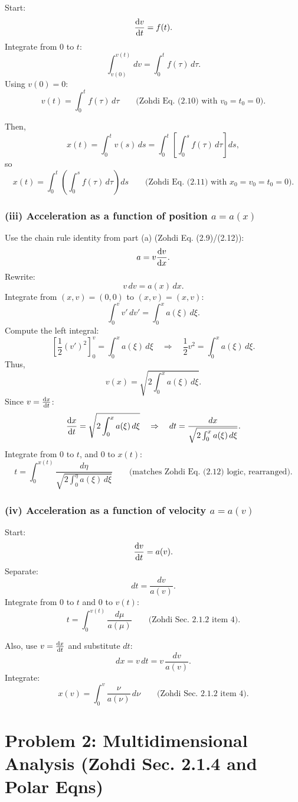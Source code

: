 \documentclass[12pt]{article}
\begin{document}
Start:
\[
\dv{v}{t} = f(t).
\]
Integrate from $0$ to $t$:
\[
\int_{v(0)}^{v(t)} dv = \int_0^{t} f(\tau)\,d\tau.
\]
Using $v(0)=0$:
\[
\boxed{v(t) = \int_0^{t} f(\tau)\,d\tau}
\qquad \text{(Zohdi Eq. (2.10) with $v_0=t_0=0$).}
\]

Then,
\[
x(t)=\int_0^{t} v(s)\,ds
     =\int_0^{t}\left[\int_0^{s} f(\tau)\,d\tau\right]ds,
\]
so
\[
\boxed{x(t)=\int_0^{t}\left(\int_0^{s} f(\tau)\,d\tau\right)ds}
\qquad \text{(Zohdi Eq. (2.11) with $x_0=v_0=t_0=0$).}
\]

\newpage
\subsubsection*{(iii) Acceleration as a function of position $a=a(x)$}

Use the chain rule identity from part (a) (Zohdi Eq. (2.9)/(2.12)):
\[
a = v\dv{v}{x}.
\]
Rewrite:
\[
v\,dv = a(x)\,dx.
\]
Integrate from $(x,v)=(0,0)$ to $(x,v)=(x,v)$:
\[
\int_{0}^{v} v'\,dv' = \int_{0}^{x} a(\xi)\,d\xi.
\]
Compute the left integral:
\[
\left[\frac12 (v')^2\right]_{0}^{v} = \int_{0}^{x} a(\xi)\,d\xi
\quad\Rightarrow\quad
\frac12 v^2 = \int_{0}^{x} a(\xi)\,d\xi.
\]
Thus,
\[
v(x)=\sqrt{2\int_{0}^{x} a(\xi)\,d\xi}.
\]
Since $v=\dv{x}{t}$:
\[
\dv{x}{t}=\sqrt{2\int_{0}^{x} a(\xi)\,d\xi}
\quad\Rightarrow\quad
dt=\frac{dx}{\sqrt{2\int_{0}^{x} a(\xi)\,d\xi}}.
\]
Integrate from $0$ to $t$, and $0$ to $x(t)$:
\[
\boxed{
t=\int_{0}^{x(t)}\frac{d\eta}{\sqrt{2\int_{0}^{\eta} a(\xi)\,d\xi}}
}
\qquad \text{(matches Zohdi Eq. (2.12) logic, rearranged).}
\]

\newpage
\subsubsection*{(iv) Acceleration as a function of velocity $a=a(v)$}

Start:
\[
\dv{v}{t} = a(v).
\]
Separate:
\[
dt = \frac{dv}{a(v)}.
\]
Integrate from $0$ to $t$ and $0$ to $v(t)$:
\[
\boxed{
t=\int_{0}^{v(t)}\frac{d\mu}{a(\mu)}
}
\qquad \text{(Zohdi Sec. 2.1.2 item 4).}
\]

Also, use $v=\dv{x}{t}$ and substitute $dt$:
\[
dx = v\,dt = v\,\frac{dv}{a(v)}.
\]
Integrate:
\[
\boxed{
x(v)=\int_{0}^{v}\frac{\nu}{a(\nu)}\,d\nu
}
\qquad \text{(Zohdi Sec. 2.1.2 item 4).}
\]

\newpage
\section*{Problem 2: Multidimensional Analysis (Zohdi Sec. 2.1.4 and Polar Eqns)}
\end{document}
